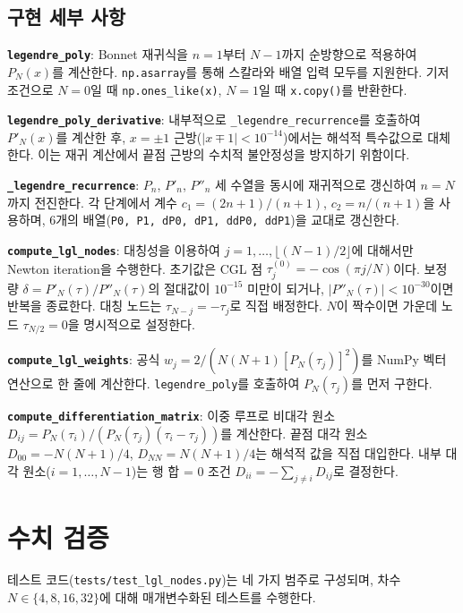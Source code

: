 \documentclass[11pt]{article}
\begin{document}
\subsection{구현 세부 사항}
\label{sec:impl_detail}

\textbf{\texttt{legendre\_poly}}: Bonnet 재귀식을 $n = 1$부터 $N-1$까지 순방향으로 적용하여 $P_N(x)$를 계산한다. \texttt{np.asarray}를 통해 스칼라와 배열 입력 모두를 지원한다. 기저 조건으로 $N = 0$일 때 \texttt{np.ones\_like(x)}, $N = 1$일 때 \texttt{x.copy()}를 반환한다.

\textbf{\texttt{legendre\_poly\_derivative}}: 내부적으로 \texttt{\_legendre\_recurrence}를 호출하여 $P'_N(x)$를 계산한 후, $x = \pm 1$ 근방($|x \mp 1| < 10^{-14}$)에서는 해석적 특수값으로 대체한다. 이는 재귀 계산에서 끝점 근방의 수치적 불안정성을 방지하기 위함이다.

\textbf{\texttt{\_legendre\_recurrence}}: $P_n$, $P'_n$, $P''_n$ 세 수열을 동시에 재귀적으로 갱신하여 $n = N$까지 전진한다. 각 단계에서 계수 $c_1 = (2n+1)/(n+1)$, $c_2 = n/(n+1)$을 사용하며, 6개의 배열(\texttt{P0, P1, dP0, dP1, ddP0, ddP1})을 교대로 갱신한다.

\textbf{\texttt{compute\_lgl\_nodes}}: 대칭성을 이용하여 $j = 1, \ldots, \lfloor(N-1)/2\rfloor$에 대해서만 Newton iteration을 수행한다. 초기값은 CGL 점 $\tau_j^{(0)} = -\cos(\pi j / N)$이다. 보정량 $\delta = P'_N(\tau) / P''_N(\tau)$의 절대값이 $10^{-15}$ 미만이 되거나, $|P''_N(\tau)| < 10^{-30}$이면 반복을 종료한다. 대칭 노드는 $\tau_{N-j} = -\tau_j$로 직접 배정한다. $N$이 짝수이면 가운데 노드 $\tau_{N/2} = 0$을 명시적으로 설정한다.

\textbf{\texttt{compute\_lgl\_weights}}: 공식 $w_j = 2/(N(N+1)[P_N(\tau_j)]^2)$를 NumPy 벡터 연산으로 한 줄에 계산한다. \texttt{legendre\_poly}를 호출하여 $P_N(\tau_j)$를 먼저 구한다.

\textbf{\texttt{compute\_differentiation\_matrix}}: 이중 루프로 비대각 원소 $D_{ij} = P_N(\tau_i) / (P_N(\tau_j) (\tau_i - \tau_j))$를 계산한다. 끝점 대각 원소 $D_{00} = -N(N+1)/4$, $D_{NN} = N(N+1)/4$는 해석적 값을 직접 대입한다. 내부 대각 원소($i = 1, \ldots, N-1$)는 행 합 = 0 조건 $D_{ii} = -\sum_{j \neq i} D_{ij}$로 결정한다.

\section{수치 검증}
\label{sec:verification}

테스트 코드(\texttt{tests/test\_lgl\_nodes.py})는 네 가지 범주로 구성되며, 차수 $N \in \{4, 8, 16, 32\}$에 대해 매개변수화된 테스트를 수행한다.
\end{document}
